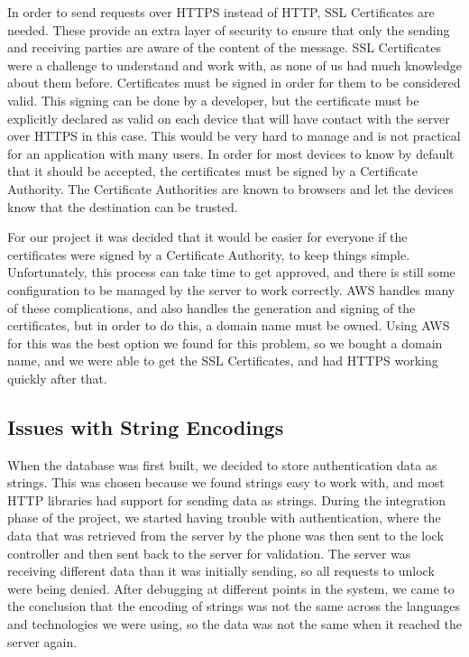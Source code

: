\documentclass[12pt]{report}
\let\Oldsubsection\subsection
\renewcommand{\subsection}{\FloatBarrier\Oldsubsection}
\begin{document}
In order to send requests over HTTPS instead of HTTP, SSL Certificates are needed.
These provide an extra layer of security to ensure that only the sending and receiving parties are
aware of the content of the message.
SSL Certificates were a challenge to understand and work with, as none of us had much
knowledge about them before. Certificates must be signed in order for them to be considered
valid. This signing can be done by a developer, but the certificate must be explicitly declared as
valid on each device that will have contact with the server over HTTPS in this case. This would
be very hard to manage and is not practical for an application with many users. In order for most
devices to know by default that it should be accepted, the certificates must be signed by a
Certificate Authority. The Certificate Authorities are known to browsers and let the devices know
that the destination can be trusted.

For our project it was decided that it would be easier for everyone if the certificates were
signed by a Certificate Authority, to keep things simple. Unfortunately, this process can take
time to get approved, and there is still some configuration to be managed by the server to work
correctly. AWS handles many of these complications, and also handles the generation and
signing of the certificates, but in order to do this, a domain name must be owned. Using AWS for
this was the best option we found for this problem, so we bought a domain name, and we were
able to get the SSL Certificates, and had HTTPS working quickly after that.


\subsection{Issues with String Encodings} \label{issues-with-string-encodings}

When the database was first built, we decided to store authentication data as strings. This
was chosen because we found strings easy to work with, and most HTTP libraries had support
for sending data as strings. During the integration phase of the project, we started having trouble
with authentication, where the data that was retrieved from the server by the phone was then sent
to the lock controller and then sent back to the server for validation. The server was receiving
different data than it was initially sending, so all requests to unlock were being denied. After
debugging at different points in the system, we came to the conclusion that the encoding of
strings was not the same across the languages and technologies we were using, so the data was
not the same when it reached the server again.
\end{document}
